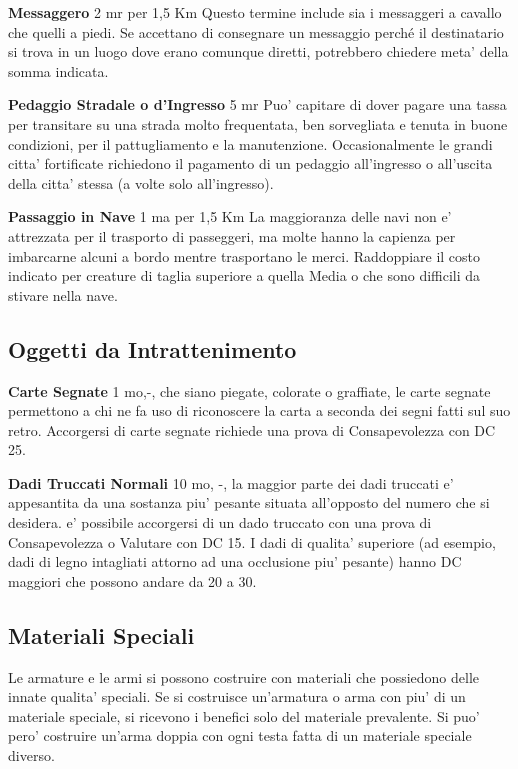 \documentclass[a4paper,11pt,twoside,openany]{book}
\begin{document}
{		\textbf{Messaggero} 2 mr per 1,5 Km Questo termine include sia i messaggeri a cavallo che quelli a piedi. Se accettano di consegnare un messaggio perché il destinatario si trova in un luogo dove erano comunque diretti, potrebbero chiedere meta' della somma indicata.
		
		\textbf{Pedaggio Stradale o d'Ingresso} 5 mr Puo' capitare di dover pagare una tassa per transitare su una strada molto frequentata, ben sorvegliata e tenuta in buone condizioni, per il pattugliamento e la manutenzione. Occasionalmente le grandi citta' fortificate richiedono il pagamento di un pedaggio all'ingresso o all'uscita della citta' stessa (a volte solo all'ingresso).
		
		\textbf{Passaggio in Nave} 1 ma per 1,5 Km La maggioranza delle navi non e' attrezzata per il trasporto di passeggeri, ma molte hanno la capienza per imbarcarne alcuni a bordo mentre trasportano le merci. Raddoppiare il costo indicato per creature di taglia superiore a quella Media o che sono difficili da stivare nella nave.
		
		\subsection{Oggetti da Intrattenimento}
		
		\label{oggetti-da-intrattenimento}
		
		\textbf{Carte Segnate} 1 mo,-, che siano piegate, colorate o graffiate, le carte segnate permettono a chi ne fa uso di riconoscere la carta a seconda dei segni fatti sul suo retro. Accorgersi di carte segnate richiede una prova di Consapevolezza con DC 25.
		
		\textbf{Dadi Truccati Normali} 10 mo, -, la maggior parte dei dadi truccati e' appesantita da una sostanza piu' pesante situata all'opposto del numero che si desidera. e' possibile accorgersi di un dado truccato con una prova di Consapevolezza o Valutare con DC 15. I dadi di qualita' superiore (ad esempio, dadi di legno intagliati attorno ad una occlusione piu' pesante) hanno DC maggiori che possono andare da 20 a 30.
		
		\pagebreak
		
		\subsection{Materiali Speciali}
		
		Le armature e le armi si possono costruire con materiali che possiedono delle innate qualita' speciali. Se si costruisce un'armatura o arma con piu' di un materiale speciale, si ricevono i benefici solo del materiale prevalente. Si puo' pero' costruire un'arma doppia con ogni testa fatta di un materiale speciale diverso.
		
}
\end{document}
